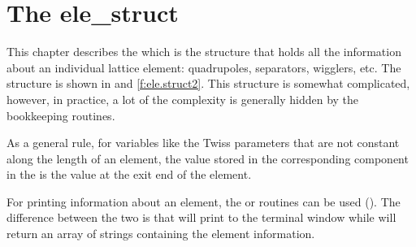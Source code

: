 \chapter{The ele_struct}
\label{c:ele.struct}

This chapter describes the  which is the structure that
holds all the information about an individual lattice element:
quadrupoles, separators, wigglers, etc. The  structure is
shown in   and \ref{f:ele.struct2}. This
structure is somewhat complicated, however, in practice, a lot of the
complexity is generally hidden  by the \bmad bookkeeping routines.

As a general rule, for variables like the Twiss parameters that are not
constant along the length of an element, the value stored in the
corresponding component in the  is the value at the exit
end of the element.

For printing information about an element, the
 or  routines
can be used (). The difference between the two is
that  will print to the terminal window while 
will return an array of strings containing the element information.

